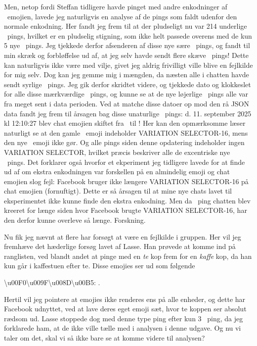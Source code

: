 \begin{article}
Men, netop fordi Steffan tidligere havde pinget med andre enkodninger af \coffee\ emojien, lavede jeg naturligvis en analyse af de pings som faldt udenfor den normale enkodning. Her fandt jeg frem til at der pludseligt nu var 214 underlige \coffee\ pings, hvilket er en pludselig stigning, som ikke helt passede overens med de kun 5 nye \textcoffee\ pings.
Jeg tjekkede derfor afsenderen af disse nye sære \coffee\ pings, og fandt til min skræk og forbløffelse ud af, at jeg selv havde sendt flere skæve \coffee\ pings! Dette kan naturligvis ikke være med vilje, givet jeg aldrig frivilligt ville blive en fejlkilde for mig selv. Dog kan jeg gemme mig i mængden, da næsten alle i chatten havde sendt syrlige \coffee\ pings. Jeg gik derfor skridtet videre, og tjekkede dato og klokkeslet for alle disse mærkværdige \coffee\ pings, og kunne se at de nye løjerlige \coffee\ pings alle var fra meget sent i data perioden. Ved at matche disse datoer op mod den rå JSON data fandt jeg frem til årsagen bag disse unaturlige \coffee\ pings: d. 11. september 2025 kl 12:10:27 blev chat emojien skiftet fra \coffee\ til \coffee\! !
Her kan den opmærksomme læser naturligt se at den gamle \coffee\ emoji indeholder VARIATION SELECTOR-16, mens den nye \coffee\ emoji ikke gør. Og alle pings siden denne opdatering indeholder ingen VARIATION SELECTOR, hvilket præcis beskriver alle de excentriske nye \coffee\ pings.
Det forklarer også hvorfor et ekperiment jeg tidligere lavede for at finde ud af om ekstra enkodningen var forskellen på en almindelig emoji og chat emojien slog fejl: Facebook bruger ikke længere VARIATION SELECTOR-16 på chat emojien (fornuftigt). Dette er så årsagen til at mine nye chats lavet til eksperimentet ikke kunne finde den ekstra enkodning. Men da \coffee\ ping chatten blev kreeret for længe siden hvor Facebook brugte VARIATION SELECTOR-16, har den derfor kunne overleve så længe. Forskning.

Nu fik jeg nævnt at flere har forsøgt at være en fejlkilde i gruppen. Her vil jeg fremhæve det hæderlige forsøg lavet af Lasse. Han prøvede at komme ind på ranglisten, ved blandt andet at pinge med en \emph{te} kop frem for en \emph{kaffe} kop, da han kun går i kaffestuen efter te. Disse emojies ser ud som følgende
\begin{center}
  \textbackslash u00F0\textbackslash u009F\textbackslash u008D\textbackslash u00B5: \tea \; .
\end{center}
Hertil vil jeg pointere at emojies ikke renderes ens på alle enheder, og dette har Facebook udnyttet, ved at lave deres eget emoji sæt, hvor te koppen ser absolut rædsom ud.
Lasse stoppede dog med denne type ping efter kun 3 \tea\ ping, da jeg forklarede ham, at de ikke ville tælle med i analysen i denne udgave. Og nu vi taler om det, skal vi så ikke bare se at komme videre til analysen?



\end{article}
